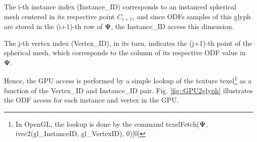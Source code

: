\documentclass[twoside,twocolumn,10pt]{article}
\begin{document}
The i-th instance index (Instance\_ID) corresponds to an instanced spherical mesh centered in its respective point $C_{i+1}$, and since ODFs samples of this glyph are stored in the (i+1)-th row of $\bm{\Psi}$, the Instance\_ID access this dimension.

The j-th vertex index (Vertex\_ID), in its turn, indicates the (j+1)-th point of the spherical mesh, which corresponds to the column of its respective ODF value in $\bm{\Psi}$.

Hence, the GPU access is performed by a simple lookup of the texture texel\footnote{In OpenGL, the lookup is done by the command texelFetch($\bm{\Psi}$, ivec2(gl\_InstanceID, gl\_VertexID), 0)[0]} as a function of the Vertex\_ID and Instance\_ID pair. Fig. \ref{fig::GPU2glyph} illustrates the ODF access for each instance and vertex in the GPU.


\end{document}
